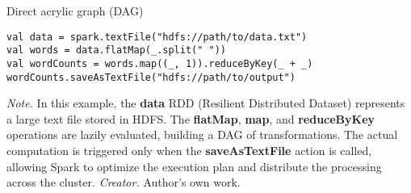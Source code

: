 \begin{table}[H]
\caption{Direct acrylic graph (DAG)}
\begin{lstlisting}
val data = spark.textFile("hdfs://path/to/data.txt")
val words = data.flatMap(_.split(" "))
val wordCounts = words.map((_, 1)).reduceByKey(_ + _)
wordCounts.saveAsTextFile("hdfs://path/to/output")
\end{lstlisting}
\small
\textit{Note.} In this example, the \textbf{data} RDD (Resilient Distributed Dataset) represents a large text file stored in HDFS. The \textbf{flatMap}, \textbf{map}, and \textbf{reduceByKey} operations are lazily evaluated, building a DAG of transformations. The actual computation is triggered only when the \textbf{saveAsTextFile} action is called, allowing Spark to optimize the execution plan and distribute the processing across the cluster.
\textit{Creator.} Author's own work.
\end{table}